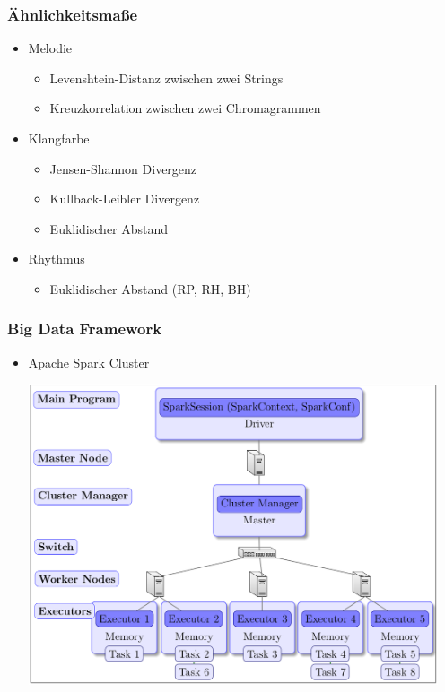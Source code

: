 \documentclass[12pt]{FSUBeamer_official}
\begin{document}
\begin{frame}
	\frametitle{Ähnlichkeitsmaße}
	\begin{itemize}
		\item Melodie
		\begin{itemize}
			\item Levenshtein-Distanz zwischen zwei Strings
			\item Kreuzkorrelation zwischen zwei Chromagrammen 
		\end{itemize}
		\item Klangfarbe
		\begin{itemize}
			\item Jensen-Shannon Divergenz 
			\item Kullback-Leibler Divergenz
			\item Euklidischer Abstand 
		\end{itemize}
		\item Rhythmus
		\begin{itemize}
			\item Euklidischer Abstand (RP, RH, BH)
		\end{itemize}
	\end{itemize}
\end{frame}

\begin{frame}
	\frametitle{Big Data Framework}
	\begin{itemize}
		\item Apache Spark Cluster
		\begin{minipage}[b]{0.85\linewidth}
			\centering
			\includegraphics[width=0.95\textwidth]{pics/Spark/cluster.png}	
		\end{minipage}
	\end{itemize}
\end{frame}
\end{document}
